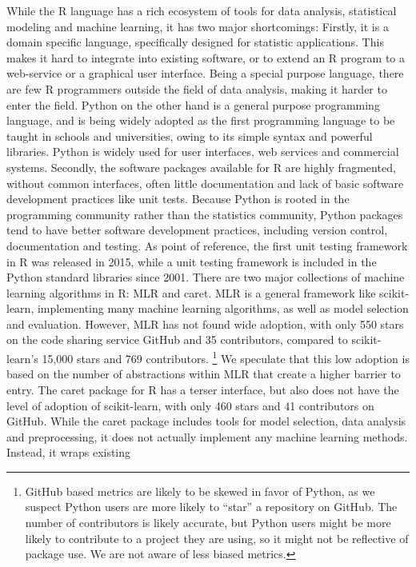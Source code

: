 While the R language has a rich ecosystem of tools for data analysis,
statistical modeling and machine learning, it has two major shortcomings:
Firstly, it is a domain specific language, specifically designed for statistic
applications. This makes it hard to integrate into existing software, or to
extend an R program to a web-service or a graphical user interface. Being a
special purpose language, there are few R programmers outside the field of data
analysis, making it harder to enter the field.
Python on the other hand is a general purpose programming language, and is being
widely adopted as the first programming language to be taught in schools and
universities, owing to its simple syntax and powerful libraries. Python is widely used
for user interfaces, web services and commercial systems.
Secondly, the software packages available for R are highly fragmented, without
common interfaces, often little documentation and lack of basic software development
practices like unit tests. Because Python is rooted in the programming community
rather than the statistics community, Python packages tend to have better software
development practices, including version control, documentation and testing. As point
of reference, the first unit testing framework in R was released in 2015, while a unit
testing framework is included in the Python standard libraries since 2001.
There are two major collections of machine learning algorithms in R: MLR and caret.
MLR is a general framework like scikit-learn, implementing many machine learning
algorithms, as well as model selection and evaluation. However, MLR has not found
wide adoption, with only 550 stars on the code sharing service GitHub and 35
contributors, compared to scikit-learn’s 15,000 stars and 769 contributors.
\footnote{GitHub based metrics are likely to be skewed in favor of Python, as we suspect Python
users are more likely to “star” a repository on GitHub. The number of contributors is
likely accurate, but Python users might be more likely to contribute to a project they are
using, so it might not be reflective of package use. We are not aware of less biased
metrics.}
We speculate that this low adoption is based on the number of abstractions
within MLR that create a higher barrier to entry.
The caret package for R has a terser interface, but also does not have the level of
adoption of scikit-learn, with only 460 stars and 41 contributors on GitHub. While the
caret package includes tools for model selection, data analysis and preprocessing, it
does not actually implement any machine learning methods. Instead, it wraps existing
